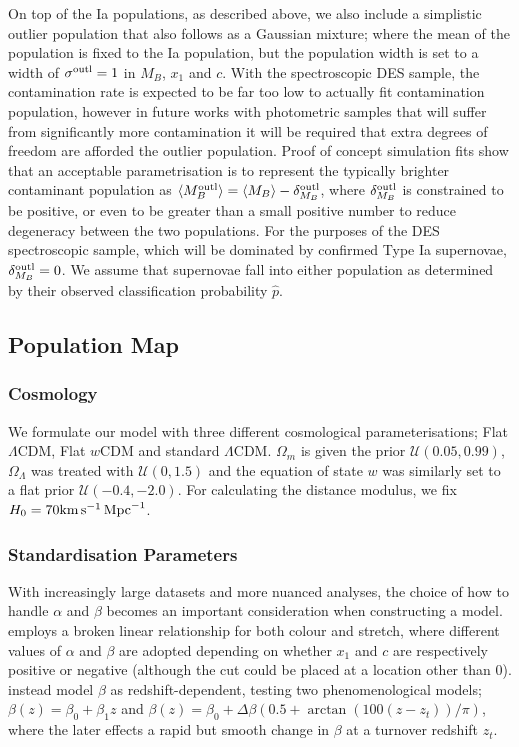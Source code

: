 \documentclass[a4paper,fleqn,usenatbib]{mnras}
\newcommand{\kmsmpc}{{\rm km}\,{\rm s}^{-1}\,{\rm Mpc}^{-1}}
\newcommand{\rubin}{\citetalias{Rubin2015}}
\begin{document}
On top of the Ia populations, as described above, we also include a simplistic outlier population that also follows {\rubin} \citep[and therefore ][]{Kunz2007} as a Gaussian mixture; where the mean of the population is fixed to the Ia population, but the population width is set to a width of $\sigma^{\rm outl} = 1$ in $M_B$, $x_1$ and $c$. With the spectroscopic DES sample, the contamination rate is expected to be far too low to actually fit contamination population, however in future works with photometric samples that will suffer from significantly more contamination it will be required that extra degrees of freedom are afforded the outlier population. Proof of concept simulation fits show that an acceptable parametrisation is to represent the typically brighter contaminant population as $\langle M_B^{\rm outl} \rangle = \langle M_B \rangle - \delta_{M_B}^{\rm outl}$, where $\delta_{M_B}^{\rm outl}$ is constrained to be positive, or even to be greater than a small positive number to reduce degeneracy between the two populations. For the purposes of the DES spectroscopic sample, which will be dominated by confirmed Type Ia supernovae, $\delta_{M_B}^{\rm outl} =0$. We assume that supernovae fall into either population as determined by their observed classification probability $\hat{p}$.


\subsection{Population Map}

\subsubsection{Cosmology}

We formulate our model with three different cosmological parameterisations; Flat $\Lambda$CDM, Flat $w$CDM and standard $\Lambda$CDM. $\Omega_m$ is given the prior $\mathcal{U}(0.05, 0.99)$, $\Omega_\Lambda$ was treated with $\mathcal{U}(0, 1.5)$ and the equation of state $w$ was similarly set to a flat prior $\mathcal{U}(-0.4, -2.0)$. For calculating the distance modulus, we fix $H_0 = 70 \kmsmpc $. 

\subsubsection{Standardisation Parameters}

With increasingly large datasets and more nuanced analyses, the choice of how to handle $\alpha$ and $\beta$ becomes an important consideration when constructing a model. {\rubin} employs a broken linear relationship for both colour and stretch, where different values of $\alpha$ and $\beta$ are adopted depending on whether $x_1$ and $c$ are respectively positive or negative (although the cut could be placed at a location other than 0). \citet{Shariff2016} instead model $\beta$ as redshift-dependent, testing two phenomenological models; $\beta(z) = \beta_0 + \beta_1 z$ and $\beta(z) = \beta_0 + \Delta \beta\left(0.5 + \arctan(100(z - z_t)) / \pi\right)$, where the later effects a rapid but smooth change in $\beta$ at a turnover redshift $z_t$.
\end{document}
